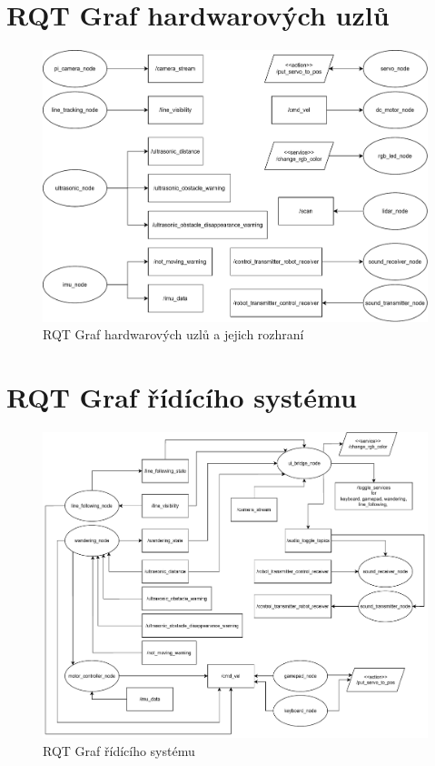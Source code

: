 
%

\chapter{RQT Graf hardwarových uzlů}

\begin{figure}[h!]
	\centering
	\includegraphics[scale=0.65]{obrazky-figures/hardware_nodes.pdf}
	\caption{RQT Graf hardwarových uzlů a jejich rozhraní}
	\label{}
\end{figure}

\chapter{RQT Graf řídícího systému}

\begin{figure}[h!]
	\centering
	\includegraphics[scale=0.55]{obrazky-figures/controller_nodes.pdf}
	\caption{RQT Graf řídícího systému}
	\label{}
\end{figure}

